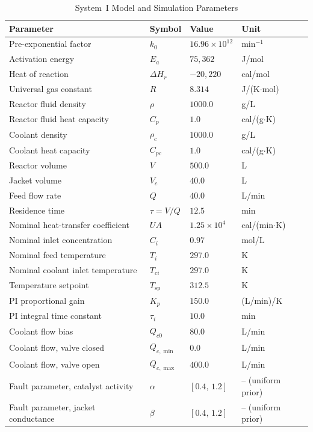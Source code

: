 \documentclass[aps,pre,twocolumn,superscriptaddress]{revtex4-2}
\begin{document}
\begin{table}[htbp]
\centering
\caption{System~I Model and Simulation Parameters}
\label{tab:si_system1_params}
\small
\begin{tabular}{llll}
\hline
\textbf{Parameter} & \textbf{Symbol} & \textbf{Value} & \textbf{Unit} \\
\hline
Pre-exponential factor & $k_0$ & $16.96\times10^{12}$ & min$^{-1}$ \\
Activation energy & $E_a$ & $75{,}362$ & J/mol \\
Heat of reaction & $\Delta H_r$ & $-20{,}220$ & cal/mol \\
Universal gas constant & $R$ & $8.314$ & J/(K$\cdot$mol) \\
Reactor fluid density & $\rho$ & $1000.0$ & g/L \\
Reactor fluid heat capacity & $C_p$ & $1.0$ & cal/(g$\cdot$K) \\
Coolant density & $\rho_c$ & $1000.0$ & g/L \\
Coolant heat capacity & $C_{pc}$ & $1.0$ & cal/(g$\cdot$K) \\
Reactor volume & $V$ & $500.0$ & L \\
Jacket volume & $V_c$ & $40.0$ & L \\
Feed flow rate & $Q$ & $40.0$ & L/min \\
Residence time & $\tau=V/Q$ & $12.5$ & min \\
Nominal heat-transfer coefficient & $UA$ & $1.25\times10^{4}$ & cal/(min$\cdot$K) \\
Nominal inlet concentration & $C_i$ & $0.97$ & mol/L \\
Nominal feed temperature & $T_i$ & $297.0$ & K \\
Nominal coolant inlet temperature & $T_{ci}$ & $297.0$ & K \\
Temperature setpoint & $T_\mathrm{sp}$ & $312.5$ & K \\
PI proportional gain & $K_p$ & $150.0$ & (L/min)/K \\
PI integral time constant & $\tau_i$ & $10.0$ & min \\
Coolant flow bias & $Q_{c0}$ & $80.0$ & L/min \\
Coolant flow, valve closed & $Q_{c,\min}$ & $0.0$ & L/min \\
Coolant flow, valve open & $Q_{c,\max}$ & $400.0$ & L/min \\
Fault parameter, catalyst activity & $\alpha$ & $[0.4,\,1.2]$ & -- (uniform prior) \\
Fault parameter, jacket conductance & $\beta$ & $[0.4,\,1.2]$ & -- (uniform prior) \\

\end{tabular}
\end{table}
\end{document}
